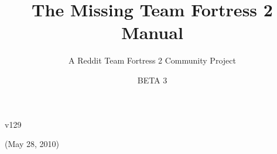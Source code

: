 \documentclass[letterpaper,12pt]{article}
\title{The Missing Team Fortress 2 Manual}
\author{A Reddit Team Fortress 2 Community Project}
\date{BETA 3}
\begin{document}
\maketitle

\vspace{140 mm}
\begin{center}v129 \end{center}

\begin{center}(May 28, 2010) \end{center}



\thispagestyle{empty}
\newpage
\pagestyle{headings}
\setcounter{page}{1}

\tableofcontents


\newpage
\setcounter{page}{1}



\newpage



\newpage


\newpage


\newpage


\newpage


\newpage


\newpage

\end{document}
